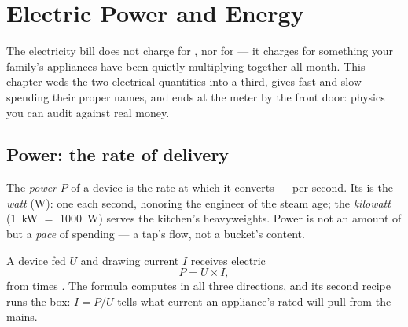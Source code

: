 \chapter{Electric Power and Energy}\label{ch:g9:electric-power-energy}

The electricity bill does not charge for , nor for
 --- it charges for something your family's appliances
have been quietly multiplying together all month. This chapter
weds the two electrical quantities into a third, gives fast
and slow spending their proper names, and ends at the meter by
the front door: physics you can audit against real money.

\section{Power: the rate of delivery}

\begin{definition}\label{def:g9:electric-power-energy:power}
The \emph{power} $P$ of a device is the rate at
which it converts  ---  per second. Its  is
the \emph{watt} (\unit{W}): one  each
second, honoring the engineer of the steam age; the
\emph{kilowatt} (\qty{1}{kW} $=$ \qty{1000}{W}) serves the
kitchen's heavyweights. Power is not an amount of  but
a \emph{pace} of spending --- a tap's flow, not a bucket's
content.
\end{definition}

\begin{proposition}\label{prop:g9:electric-power-energy:UI}
A device fed  $U$ and drawing current $I$ receives
electric 
\[
P = U \times I ,
\]
 from  times . The formula computes in all
three directions, and its second recipe runs the  box:
$I = P/U$ tells what current an appliance's rated  will
pull from the mains.
\end{proposition}

